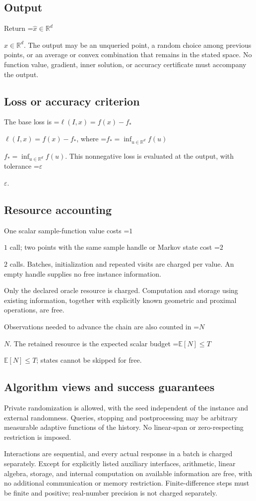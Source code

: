 \documentclass[10pt,a4paper]{article}
\newcommand{\AtlasMath}[1]{\par\begingroup\centering\setbox0=\hbox{$\displaystyle #1$}\ifdim\wd0>1.4\linewidth\typeout{ATLAS WIDE FORMULA: \the\wd0}\fi\ifdim\wd0>\linewidth\resizebox{\linewidth}{!}{\box0}\else\box0\fi\par\endgroup}
\newcommand{\AtlasInlineMath}[1]{\begingroup\setbox0=\hbox{$#1$}\ifdim\wd0>.4\linewidth\endgroup\AtlasMath{#1}\else\endgroup$#1$\fi}
\begin{document}
\subsection{Output}
Return \AtlasInlineMath{\widehat{x}\in \mathbb{R}^d}. The output may be an unqueried point, a random choice among previous points, or an average or convex combination that remains in the stated space. No function value, gradient, inner solution, or accuracy certificate must accompany the output.

\subsection{Loss or accuracy criterion}
The base loss is \AtlasInlineMath{\ell(I,x)=f(x)-f_*}, where \AtlasInlineMath{f_*=\inf_{u\in \mathbb{R}^d}f(u)}. This nonnegative loss is evaluated at the output, with tolerance \AtlasInlineMath{\varepsilon}.

\subsection{Resource accounting}
One scalar sample-function value costs \AtlasInlineMath{1} call; two points with the same sample handle or Markov state cost \AtlasInlineMath{2} calls. Batches, initialization and repeated visits are charged per value. An empty handle supplies no free instance information.

Only the declared oracle resource is charged. Computation and storage using existing information, together with explicitly known geometric and proximal operations, are free.

Observations needed to advance the chain are also counted in \AtlasInlineMath{N}. The retained resource is the expected scalar budget \AtlasInlineMath{\mathbb{E}[N]\le T}; states cannot be skipped for free.

\subsection{Algorithm views and success guarantees}
Private randomization is allowed, with the seed independent of the instance and external randomness. Queries, stopping and postprocessing may be arbitrary measurable adaptive functions of the history. No linear-span or zero-respecting restriction is imposed.

Interactions are sequential, and every actual response in a batch is charged separately. Except for explicitly listed auxiliary interfaces, arithmetic, linear algebra, storage, and internal computation on available information are free, with no additional communication or memory restriction. Finite-difference steps must be finite and positive; real-number precision is not charged separately.
\end{document}
